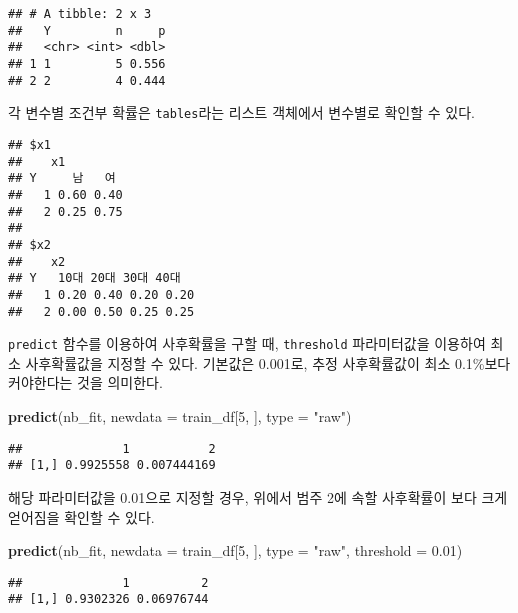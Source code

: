 \documentclass[]{book}
\newenvironment{Shaded}{\begin{snugshade}}{\end{snugshade}}
\newcommand{\DataTypeTok}[1]{\textcolor[rgb]{0.13,0.29,0.53}{#1}}
\newcommand{\DecValTok}[1]{\textcolor[rgb]{0.00,0.00,0.81}{#1}}
\newcommand{\FloatTok}[1]{\textcolor[rgb]{0.00,0.00,0.81}{#1}}
\newcommand{\KeywordTok}[1]{\textcolor[rgb]{0.13,0.29,0.53}{\textbf{#1}}}
\newcommand{\NormalTok}[1]{#1}
\newcommand{\OperatorTok}[1]{\textcolor[rgb]{0.81,0.36,0.00}{\textbf{#1}}}
\newcommand{\StringTok}[1]{\textcolor[rgb]{0.31,0.60,0.02}{#1}}
\begin{document}
\begin{verbatim}
## # A tibble: 2 x 3
##   Y         n     p
##   <chr> <int> <dbl>
## 1 1         5 0.556
## 2 2         4 0.444
\end{verbatim}

각 변수별 조건부 확률은 \texttt{tables}라는 리스트 객체에서 변수별로 확인할 수 있다.

\begin{Shaded}
\end{Shaded}

\begin{verbatim}
## $x1
##    x1
## Y     남   여
##   1 0.60 0.40
##   2 0.25 0.75
## 
## $x2
##    x2
## Y   10대 20대 30대 40대
##   1 0.20 0.40 0.20 0.20
##   2 0.00 0.50 0.25 0.25
\end{verbatim}

\texttt{predict} 함수를 이용하여 사후확률을 구할 때, \texttt{threshold} 파라미터값을 이용하여 최소 사후확률값을 지정할 수 있다. 기본값은 0.001로, 추정 사후확률값이 최소 0.1\%보다 커야한다는 것을 의미한다.

\begin{Shaded}
\begin{Highlighting}[]
\KeywordTok{predict}\NormalTok{(nb_fit, }\DataTypeTok{newdata =}\NormalTok{ train_df[}\DecValTok{5}\NormalTok{, ], }\DataTypeTok{type =} \StringTok{"raw"}\NormalTok{)}
\end{Highlighting}
\end{Shaded}

\begin{verbatim}
##              1           2
## [1,] 0.9925558 0.007444169
\end{verbatim}

해당 파라미터값을 0.01으로 지정할 경우, 위에서 범주 2에 속할 사후확률이 보다 크게 얻어짐을 확인할 수 있다.

\begin{Shaded}
\begin{Highlighting}[]
\KeywordTok{predict}\NormalTok{(nb_fit, }\DataTypeTok{newdata =}\NormalTok{ train_df[}\DecValTok{5}\NormalTok{, ], }\DataTypeTok{type =} \StringTok{"raw"}\NormalTok{, }\DataTypeTok{threshold =} \FloatTok{0.01}\NormalTok{)}
\end{Highlighting}
\end{Shaded}

\begin{verbatim}
##              1          2
## [1,] 0.9302326 0.06976744
\end{verbatim}
\end{document}
